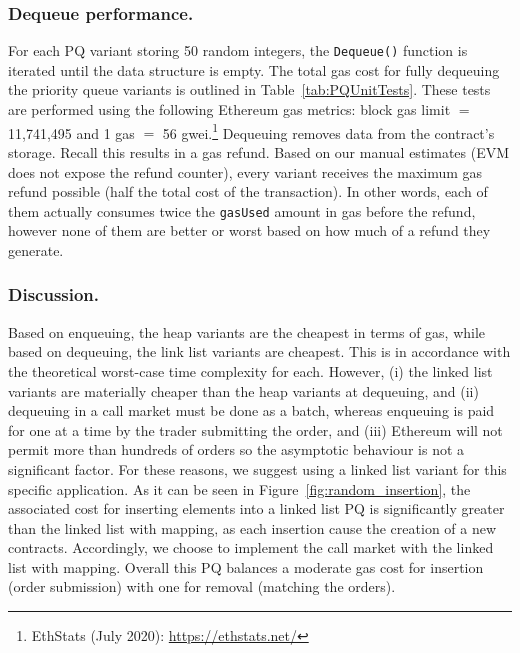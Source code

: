 \subsubsection{Dequeue performance.} For each PQ variant storing 50 random integers, the \texttt{Dequeue()} function is iterated until the data structure is empty. The total gas cost for fully dequeuing the priority queue variants is outlined in Table~\ref{tab:PQUnitTests}. These tests are performed using the following Ethereum gas metrics: block gas limit $=$11,741,495 and 1 gas $=$ 56 gwei.\footnote{EthStats (July 2020): \url{https://ethstats.net/}} Dequeuing removes data from the contract's storage. Recall this results in a gas refund. Based on our manual estimates (EVM does not expose the refund counter), every variant receives the maximum gas refund possible (\ie half the total cost of the transaction). In other words, each of them actually consumes twice the \texttt{gasUsed} amount in gas before the refund, however none of them are better or worst based on how much of a refund they generate.  

\subsubsection{Discussion.} Based on enqueuing, the heap variants are the cheapest in terms of gas, while based on dequeuing, the link list variants are cheapest. This is in accordance with the theoretical worst-case time complexity for each. However, (i) the linked list variants are materially cheaper than the heap variants at dequeuing, and (ii) dequeuing in a call market must be done as a batch, whereas enqueuing is paid for one at a time by the trader submitting the order, and (iii) Ethereum will not permit more than hundreds of orders so the asymptotic behaviour is not a significant factor. For these reasons, we suggest using a linked list variant for this specific application. As it can be seen in Figure~\ref{fig:random_insertion}, the associated cost for inserting elements into a linked list PQ is significantly greater than the linked list with mapping, as each insertion cause the creation of a new contracts. Accordingly, we choose to implement the call market with the linked list with mapping. Overall this PQ balances a moderate gas cost for insertion (\ie order submission) with one for removal (\ie matching the orders). 


